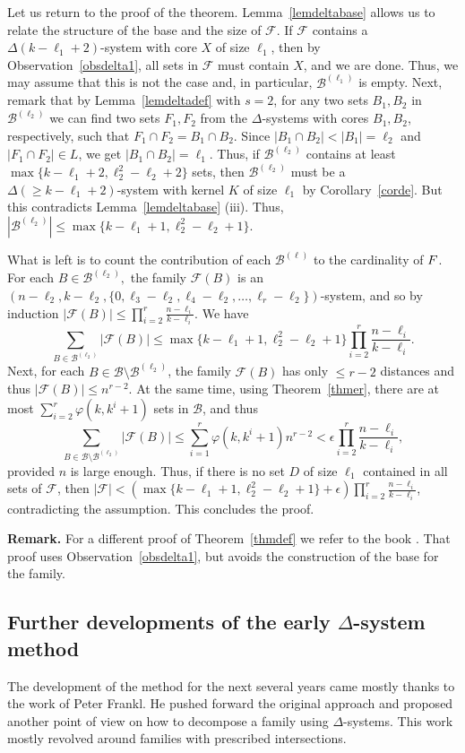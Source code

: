 \documentclass[graybox]{svmult}
\renewcommand{\le}{\leqslant}
\renewcommand{\ge}{\geqslant}
\newcommand{\ff}{\mathcal{F}}
\newcommand{\m}{\mathcal}
\begin{document}
Let us return to the proof of the theorem. Lemma~\ref{lemdeltabase} allows us to relate the structure of the base and the size of $\ff$. If $\ff$ contains a $\Delta(k-\ell_1+2)$-system with core $X$ of size $\ell_1$, then by Observation~\ref{obsdelta1}, all sets in $\m F$ must contain $X$, and we are done. Thus, we may assume that this is not the case and, in particular, $\m B^{(\ell_1)}$ is empty. Next, remark that by Lemma~\ref{lemdeltadef} with $s=2$, for any two sets $B_1,B_2$ in $\m B^{(\ell_2)}$ we can find two sets $F_1,F_2$ from the $\Delta$-systems with cores $B_1,B_2$, respectively, such that $F_1\cap F_2 = B_1\cap B_2$.  Since $|B_1\cap B_2|< |B_1|=\ell_2$ and $|F_1\cap F_2|\in L$, we get $|B_1\cap B_2|=\ell_1$. Thus, if $\m B^{(\ell_2)}$ contains at least $\max\{k-\ell_1+2, \ell_2^2-\ell_2+2\}$ sets, then $\m B^{(\ell_2)}$ must be a $\Delta(\ge k-\ell_1+2)$-system with kernel $K$ of size $\ell_1$ by Corollary~\ref{corde}. But this contradicts Lemma~\ref{lemdeltabase} (iii). Thus, $|\m B^{(\ell_2)}|\le \max\{k-\ell_1+1, \ell_2^2-\ell_2+1\}$.

What is left is to count the contribution of each $\m B^{(\ell)}$ to the cardinality of $\m \ff$. For each $B\in \m B^{(\ell_2)},$
the family $\ff(B)$ is an $(n-\ell_2,k-\ell_2,\{0,\ell_3-\ell_2,\ell_4-\ell_2,\ldots, \ell_r-\ell_2\})$-system, and so by induction $|\ff(B)|\le \prod_{i=2}^r\frac{n-\ell_i}{k-\ell_i}$. We have
$$\sum_{B\in \m B^{(\ell_2)}}|\ff(B)|\le \max\{k-\ell_1+1, \ell_2^2-\ell_2+1\}\prod_{i=2}^r\frac{n-\ell_i}{k-\ell_i}.$$
Next, for each $B\in \m B\setminus \m B^{(\ell_2)}$, the family $\ff(B)$ has only $\le r-2$ distances and thus $|\ff(B)|\le n^{r-2}$. At the same time, using Theorem~\ref{thmer}, there are at most $\sum_{i=2}^r\varphi(k,k^{i}+1)$ sets in $\m B$, and thus
$$\sum_{B\in \m B\setminus\m B^{(\ell_2)}}|\ff(B)|\le \sum_{i=1}^r\varphi(k,k^{i}+1)n^{r-2}<\epsilon \prod_{i=2}^r\frac{n-\ell_i}{k-\ell_i},$$
provided $n$ is large enough. Thus, if there is no set $D$ of size $\ell_1$ contained in all sets of $\ff$, then $|\ff|<(\max\{k-\ell_1+1, \ell_2^2-\ell_2+1\}+\epsilon)\prod_{i=2}^r\frac{n-\ell_i}{k-\ell_i}$, contradicting the assumption. This concludes the proof.


{\bf Remark. }  For a different proof of Theorem~\ref{thmdef}  we refer to the book \cite{FT}. That proof uses Observation~\ref{obsdelta1}, but avoids the  construction of the base for the family.


\subsection{Further developments of the early $\Delta$-system method}\label{sec2.4} The development of the method for the next several years came mostly thanks to the work of Peter Frankl. He pushed forward the original approach and proposed another point of view on how to decompose a family using $\Delta$-systems. This work mostly revolved around families with prescribed intersections.
\end{document}

